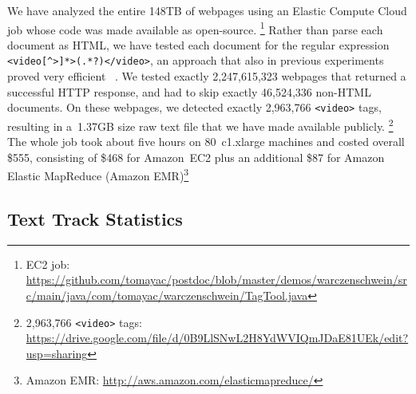 \documentclass{sig-alternate}
\newcommand{\inlinelistingsize}{\fontsize{8pt}{11pt}}
\let\oldurl\url
\renewcommand{\url}[1]{\inlinelistingsize\oldurl{#1}}
\begin{document}
We have analyzed the entire 148TB of webpages
using an Elastic Compute Cloud job
whose code was made available as open-source.%
\footnote{EC2 job:
\url{https://github.com/tomayac/postdoc/blob/master/demos/warczenschwein/src/main/java/com/tomayac/warczenschwein/TagTool.java}}
Rather than parse each document as HTML,
we have tested each document for the regular expression
\texttt{<video[\^{}>]*>(.*?)</video>},
an approach that also in previous experiments
proved very efficient%
~\cite{bizer2013deployment,muhleisen2012web}.
We tested exactly 2,247,615,323 webpages
that returned a successful HTTP response,
and had to skip exactly 46,524,336  non-HTML documents.
On these webpages, we detected exactly
2,963,766 \texttt{<video>} tags,
resulting in a~1.37GB size raw text file
that we have made available publicly.%
\footnote{2,963,766 \texttt{<video>} tags: \url{https://drive.google.com/file/d/0B9LlSNwL2H8YdWVIQmJDaE81UEk/edit?usp=sharing}}
The whole job took about five hours on
80~c1.xlarge machines and costed overall \$555,
consisting of \$468 for Amazon~EC2
plus an additional \$87 for Amazon Elastic MapReduce
 (Amazon EMR)\footnote{Amazon EMR:
\url{http://aws.amazon.com/elasticmapreduce/}}

\subsection{Text Track Statistics}
\end{document}
